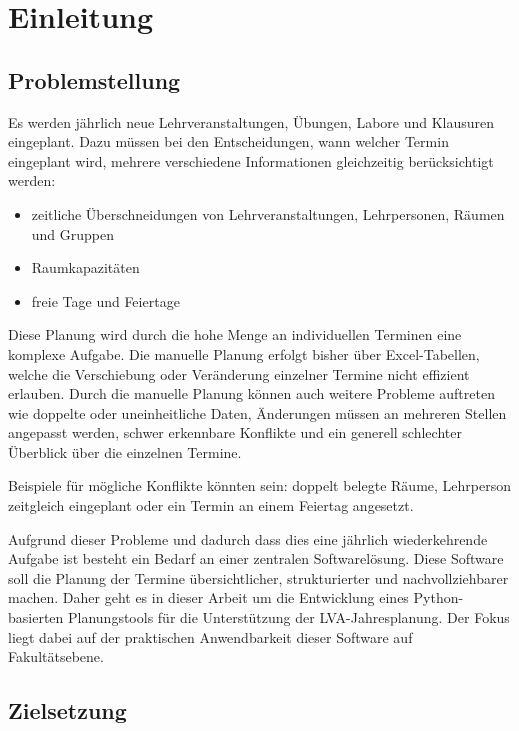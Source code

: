 \documentclass[12pt,a4paper]{article}
\begin{document}
\newpage

\clearpage
{}
\section{Einleitung}

\subsection{Problemstellung}

Es werden jährlich neue Lehrveranstaltungen, Übungen, Labore und Klausuren eingeplant. Dazu müssen bei den Entscheidungen, wann welcher Termin eingeplant wird, mehrere verschiedene Informationen gleichzeitig berücksichtigt werden:

\begin{itemize}
\item zeitliche Überschneidungen von Lehrveranstaltungen, Lehrpersonen, Räumen und Gruppen
\item Raumkapazitäten
\item freie Tage und Feiertage
\end{itemize}

Diese Planung wird durch die hohe Menge an individuellen Terminen eine komplexe Aufgabe. Die manuelle Planung erfolgt bisher über Excel-Tabellen, welche die Verschiebung oder Veränderung einzelner Termine nicht effizient erlauben.
Durch die manuelle Planung können auch weitere Probleme auftreten wie doppelte oder uneinheitliche Daten, Änderungen müssen an mehreren Stellen angepasst werden, schwer erkennbare Konflikte und ein generell schlechter Überblick über die einzelnen Termine.

Beispiele für mögliche Konflikte könnten sein: doppelt belegte Räume, Lehrperson zeitgleich eingeplant oder ein Termin an einem Feiertag angesetzt.

Aufgrund dieser Probleme und dadurch dass dies eine jährlich wiederkehrende Aufgabe ist besteht ein Bedarf an einer zentralen Softwarelösung. Diese Software soll die Planung der Termine übersichtlicher, strukturierter und nachvollziehbarer machen.
Daher geht es in dieser Arbeit um die Entwicklung eines Python-basierten Planungstools für die Unterstützung der LVA-Jahresplanung. Der Fokus liegt dabei auf der praktischen Anwendbarkeit dieser Software auf Fakultätsebene.

\subsection{Zielsetzung}
\end{document}
